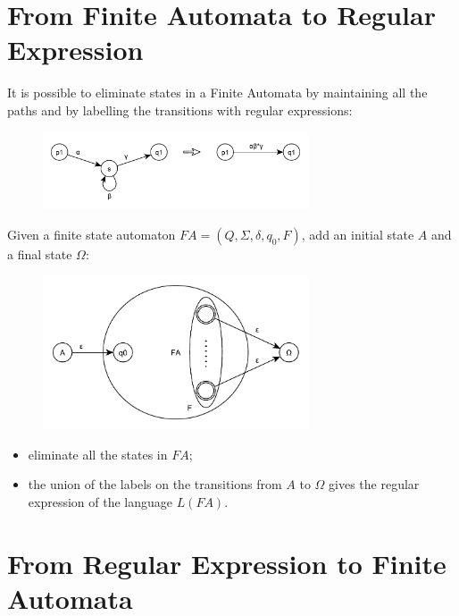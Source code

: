 \section{From Finite Automata to Regular Expression}
It is possible to eliminate states in a Finite Automata by maintaining all the paths and by labelling the transitions with regular expressions:
\begin{figure}[H]
	\centerline{\includegraphics[width=0.7\textwidth]{img/2.pdf}}
\end{figure}
Given a finite state automaton $FA = (Q, \Sigma, \delta, q_0, F)$, add an initial state $A$ and a final state $\Omega$:
\begin{figure}[H]
	\centerline{\includegraphics[width=0.7\textwidth]{img/3.pdf}}
\end{figure}
\begin{itemize}
	\item eliminate all the states in $FA$;
	\item the union of the labels on the transitions from $A$ to $\Omega$ gives the regular expression of the language $L(FA)$.
\end{itemize}

\section{From Regular Expression to Finite Automata}


